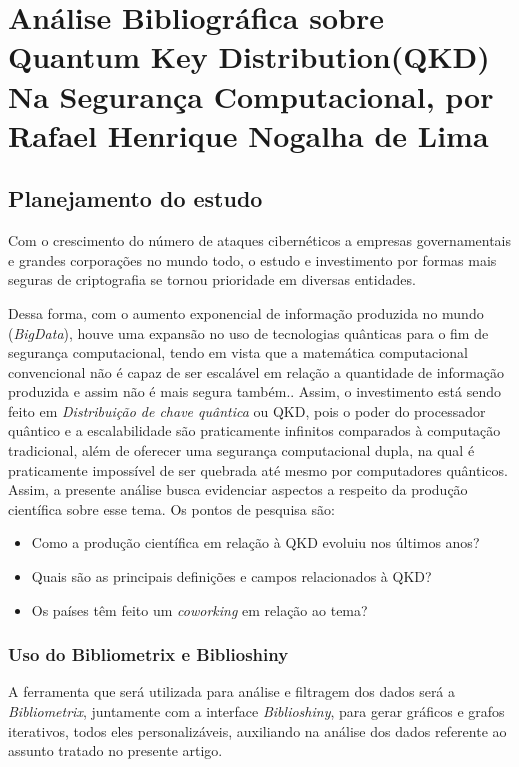 \chapter{Análise Bibliográfica sobre Quantum Key Distribution(QKD) Na Segurança Computacional, por Rafael Henrique Nogalha de Lima}

\section{Planejamento do estudo}

Com o crescimento do número de ataques cibernéticos a empresas governamentais e grandes corporações no mundo todo, o estudo e investimento por formas mais seguras de criptografia se tornou prioridade em diversas entidades. 

Dessa forma, com o aumento exponencial de informação produzida no mundo (\textit{BigData}), houve uma expansão no uso de tecnologias quânticas para o fim de segurança computacional, tendo em vista que a matemática computacional convencional não é capaz de ser escalável em relação a quantidade de informação produzida e assim não é mais segura também.. Assim, o investimento está sendo feito em \textit{Distribuição de chave quântica} ou QKD, pois o poder do processador quântico e a escalabilidade são praticamente infinitos comparados à computação tradicional, além de oferecer uma segurança computacional dupla, na qual é praticamente impossível de ser quebrada até mesmo por computadores quânticos. Assim, a presente análise busca evidenciar aspectos a respeito da produção científica sobre esse tema. Os pontos de pesquisa são:

\begin{itemize}
    \item Como a produção científica em relação à QKD evoluiu nos últimos anos?
    \item Quais são as principais definições e campos relacionados à QKD?
    \item Os países têm feito um \textit{coworking} em relação ao tema?
\end{itemize}

\subsection{Uso do Bibliometrix e Biblioshiny}

A ferramenta que será utilizada para análise e filtragem dos dados será a \textit{Bibliometrix}, juntamente com a interface \textit{Biblioshiny}, para gerar gráficos e grafos iterativos, todos eles personalizáveis, auxiliando na análise dos dados referente ao assunto tratado no presente artigo.

